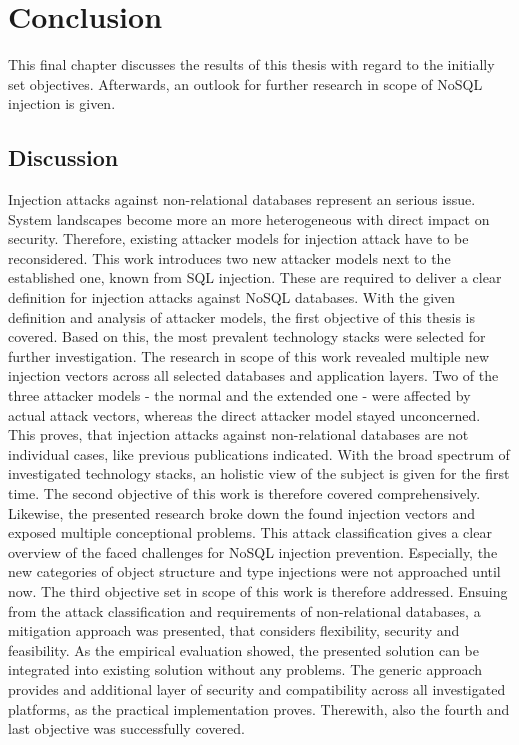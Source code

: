 \chapter{Conclusion}
This final chapter discusses the results of this thesis with regard to the initially set objectives. Afterwards, an outlook for further research in scope of NoSQL injection is given.

\section{Discussion}
Injection attacks against non-relational databases represent an serious issue. System landscapes become more an more heterogeneous with direct impact on security. Therefore, existing attacker models for injection attack have to be reconsidered. This work introduces two new attacker models next to the established one, known from SQL injection. These are required to deliver a clear definition for injection attacks against NoSQL databases. With the given definition and analysis of attacker models, the first objective of this thesis is covered. Based on this, the most prevalent technology stacks were selected for further investigation. The research in scope of this work revealed multiple new injection vectors across all selected databases and application layers. Two of the three attacker models - the normal and the extended one - were affected by actual attack vectors, whereas the direct attacker model stayed unconcerned. This proves, that injection attacks against non-relational databases are not individual cases, like previous publications indicated. With the broad spectrum of investigated technology stacks, an holistic view of the subject is given for the first time. The second objective of this work is therefore covered comprehensively. Likewise, the presented research broke down the found injection vectors and exposed multiple conceptional problems. This attack classification gives a clear overview of the faced challenges for NoSQL injection prevention. Especially, the new categories of object structure and type injections were not approached until now. The third objective set in scope of this work is therefore addressed. Ensuing from the attack classification and requirements of non-relational databases, a mitigation approach was presented, that considers flexibility, security and feasibility. As the empirical evaluation showed, the presented solution can be integrated into existing solution without any problems. The generic approach provides and additional layer of security and compatibility across all investigated platforms, as the practical implementation proves. Therewith, also the fourth and last objective was successfully covered. \\


